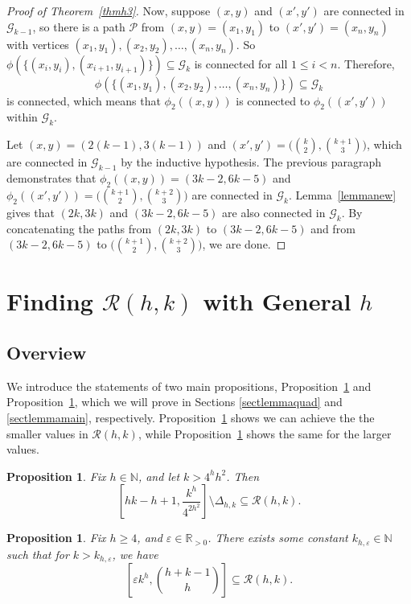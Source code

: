 \documentclass[10pt,a4paper]{article}
\newtheorem{proposition}[theorem]{Proposition}
\theoremstyle{definition}
\theoremstyle{remark}
\numberwithin{equation}{section}
\numberwithin{theorem}{section}
\newcommand{\N}{\mathbb{N}}
\newcommand{\R}{\mathbb{R}}
\newcommand{\calg}{\mathcal{G}}
\newcommand{\calr}{\mathcal{R}}
\begin{document}
\begin{proof}[Proof of Theorem~\ref{thmh3}]
    Now, suppose $(x,y)$ and $(x',y')$ are connected in $\calg_{k-1}$, so there is a path $\mathcal{P}$ from $(x,y)=(x_1,y_1)$ to $(x',y')=(x_n,y_n)$ with vertices $(x_1,y_1),(x_2,y_2),\ldots,(x_n,y_n)$. So $\phi(\{(x_i,y_i),(x_{i+1},y_{i+1})\}) \subseteq \calg_k$ is connected for all $1 \leq i < n$. Therefore, \[\phi(\{(x_1,y_1),(x_2,y_2),\ldots,(x_n,y_n)\})\subseteq \calg_k\] is connected, which means that $\phi_2((x,y))$ is connected to $\phi_2((x',y'))$ within $\calg_k$.

    Let $(x,y) = (2(k-1),3(k-1))$ and $(x',y') = \big(\binom{k}{2},\binom{k+1}{3}\big)$, which are connected in $\calg_{k-1}$ by the inductive hypothesis. The previous paragraph demonstrates that $\phi_2((x,y)) = (3k-2,6k-5)$ and $\phi_2((x',y'))= \big(\binom{k+1}{2},\binom{k+2}{3}\big)$ are connected in $\calg_k$. Lemma~\ref{lemmanew} gives that $(2k,3k)$ and $(3k-2,6k-5)$ are also connected in $\calg_k$. By concatenating the paths from $(2k,3k)$ to $(3k-2,6k-5)$ and from $(3k-2,6k-5)$ to $\big(\binom{k+1}{2},\binom{k+2}{3}\big)$, we are done.
\end{proof}

\section{Finding \texorpdfstring{$\calr(h,k)$}{R(h,k)} with General \texorpdfstring{$h$}{h}}\label{sectgeneralh}

\subsection{Overview}
We introduce the statements of two main propositions, Proposition~\ref{lemmaQuadratic} and Proposition~\ref{lemmaMain}, which we will prove in Sections \ref{sectlemmaquad} and \ref{sectlemmamain}, respectively. Proposition~\ref{lemmaQuadratic} shows we can achieve the the smaller values in $\calr(h,k)$, while Proposition~\ref{lemmaMain} shows the same for the larger values. 

\begin{proposition}\label{lemmaQuadratic}
Fix $h \in \N$, and let $k > 4^hh^2$. Then \[\left[hk-h+1,\frac{k^h}{4^{2h^2}}\right]\setminus \Delta_{h,k} \subseteq \calr(h,k).\]
\end{proposition}

\begin{proposition}\label{lemmaMain}
    Fix $h \geq 4$, and $\varepsilon \in \R_{>0}$. There exists some constant $k_{h,\varepsilon} \in \N$ such that for $k > k_{h,\varepsilon}$, we have \[\left[\varepsilon k^h,\binom{h+k-1}{h}\right] \subseteq \mathcal{R}(h,k).\]
\end{proposition}
\end{document}
